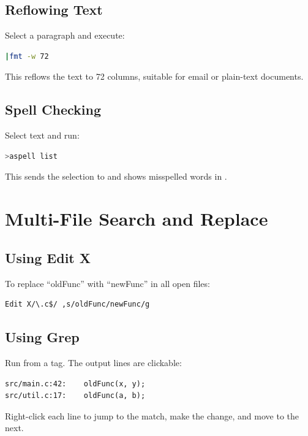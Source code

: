 \subsection{Reflowing Text}

Select a paragraph and execute:

\begin{lstlisting}[language=bash]
|fmt -w 72
\end{lstlisting}

This reflows the text to 72 columns, suitable for email or plain-text
documents.

\subsection{Spell Checking}

Select text and run:

\begin{lstlisting}[language=bash]
>aspell list
\end{lstlisting}

This sends the selection to  and shows misspelled words in
.

\section{Multi-File Search and Replace}
\label{sec:multifile}

\subsection{Using Edit X}

To replace ``oldFunc'' with ``newFunc'' in all open  files:

\begin{Verbatim}[frame=single]
Edit X/\.c$/ ,s/oldFunc/newFunc/g
\end{Verbatim}

\subsection{Using Grep}

Run  from a tag.  The output lines are
clickable:

\begin{Verbatim}[frame=single]
src/main.c:42:    oldFunc(x, y);
src/util.c:17:    oldFunc(a, b);
\end{Verbatim}

Right-click each line to jump to the match, make the change, and move
to the next.

